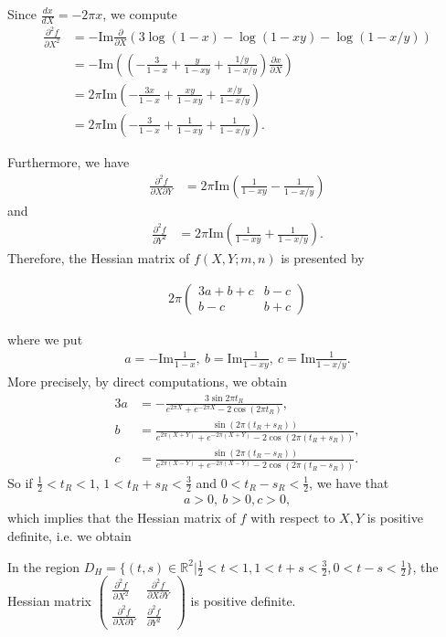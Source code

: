 \documentclass[12pt]{amsart}
\begin{document}
Since $\frac{dx}{dX}=-2\pi x$, we compute
\begin{align} \label{formula-partialfXX}
    \frac{\partial^2 f}{\partial X^2}&=-\text{Im}\frac{\partial }{\partial X}\left(3\log(1-x)-\log(1-xy)-\log(1-x/y)\right)\\\nonumber
    &=-\text{Im}\left(\left(-\frac{3}{1-x}+\frac{y}{1-xy}+\frac{1/y}{1-x/y}\right)\frac{\partial x}{\partial X}\right)\\\nonumber
    &=2\pi \text{Im}\left(-\frac{3x}{1-x}+\frac{xy}{1-xy}+\frac{x/y}{1-x/y}\right)\\\nonumber
    &=2\pi \text{Im}\left(-\frac{3}{1-x}+\frac{1}{1-xy}+\frac{1}{1-x/y}\right).
\end{align}

Furthermore, we have
\begin{align}
     \frac{\partial^2 f}{\partial X\partial Y}&=2\pi \text{Im}\left(\frac{1}{1-xy}-\frac{1}{1-x/y}\right)
\end{align}
and 
\begin{align}
    \frac{\partial^2 f}{\partial Y^2}&=2\pi \text{Im}\left(\frac{1}{1-xy}+\frac{1}{1-x/y}\right).
\end{align}
Therefore, the Hessian matrix of $f(X,Y;m,n)$ is presented by 

\begin{align}
    2\pi \begin{pmatrix}
     3a+b+c & b-c \\
     b-c & b+c
    \end{pmatrix}
\end{align}

where we put 
\begin{align}
    a=-\text{Im} \frac{1}{1-x}, \ b=\text{Im}\frac{1}{1-xy}, \ c=\text{Im} \frac{1}{1-x/y}. 
\end{align}
More precisely, by direct computations, we obtain
\begin{align}
    3a&=-\frac{3\sin 2\pi t_R}{e^{2\pi X}+e^{-2\pi X}-2\cos(2\pi t_R)}, \\ \nonumber
    b&=\frac{\sin(2\pi (t_R+s_R))}{e^{2\pi(X+Y)}+e^{-2\pi(X+Y)}-2\cos (2\pi(t_R+s_R))}, \\\nonumber
    c&=\frac{\sin(2\pi (t_R-s_R))}{e^{2\pi(X-Y)}+e^{-2\pi(X-Y)}-2\cos (2\pi(t_R-s_R))}.
\end{align}
So if $\frac{1}{2}<t_R<1$, $1<t_R+s_R<\frac{3}{2}$ and $0<t_R-s_R<\frac{1}{2}$, we have that 
\begin{align}
    a>0, \ b>0, c>0,
\end{align}
which implies that the Hessian matrix of $f$ with respect to $X,Y$ is positive definite, i.e. we obtain 
\begin{lemma} \label{lemma-HessXY}
    In the region $D_{H}=\{(t,s)\in \mathbb{R}^2|\frac{1}{2}<t<1, 1<t+s<\frac{3}{2}, 0<t-s<\frac{1}{2}\}$, the Hessian matrix $\begin{pmatrix}
     \frac{\partial^2 f}{\partial X^2} & \frac{\partial^2 f}{\partial X\partial Y} \\
     \frac{\partial^2 f}{\partial X\partial Y} & \frac{\partial^2 f}{\partial Y^2}
    \end{pmatrix}$  is positive definite. 
\end{lemma}
\end{document}
